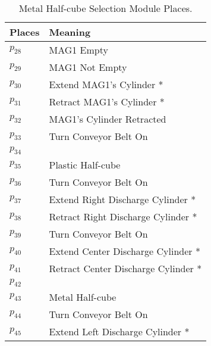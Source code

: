 \begin{table}[H]
\caption{Metal Half-cube Selection Module Places.}
\centering
\begin{tabular}{M{5cm}M{10cm}}
Places & Meaning\\
\hline
\hyperlink{partialNet:p281}{\hypertarget{partialTable:p28}{$p_{28}$}} & MAG1 Empty\\
\hyperlink{partialNet:p291}{\hypertarget{partialTable:p29}{$p_{29}$}} & MAG1 Not Empty\\
\hyperlink{partialNet:p301}{\hypertarget{partialTable:p30}{$p_{30}$}} & Extend MAG1's Cylinder *\\
\hyperlink{partialNet:p311}{\hypertarget{partialTable:p31}{$p_{31}$}} & Retract MAG1's Cylinder *\\
\hyperlink{partialNet:p321}{\hypertarget{partialTable:p32}{$p_{32}$}} & MAG1's Cylinder Retracted\\
\hyperlink{partialNet:p331}{\hypertarget{partialTable:p33}{$p_{33}$}} & Turn Conveyor Belt On\\
\hyperlink{partialNet:p341}{\hypertarget{partialTable:p34}{$p_{34}$}} & \\
\hyperlink{partialNet:p351}{\hypertarget{partialTable:p35}{$p_{35}$}} & Plastic Half-cube\\
\hyperlink{partialNet:p361}{\hypertarget{partialTable:p36}{$p_{36}$}} & Turn Conveyor Belt On\\
\hyperlink{partialNet:p371}{\hypertarget{partialTable:p37}{$p_{37}$}} & Extend Right Discharge Cylinder *\\
\hyperlink{partialNet:p381}{\hypertarget{partialTable:p38}{$p_{38}$}} & Retract Right Discharge Cylinder *\\
\hyperlink{partialNet:p391}{\hypertarget{partialTable:p39}{$p_{39}$}} & Turn Conveyor Belt On\\
\hyperlink{partialNet:p401}{\hypertarget{partialTable:p40}{$p_{40}$}} & Extend Center Discharge Cylinder *\\
\hyperlink{partialNet:p411}{\hypertarget{partialTable:p41}{$p_{41}$}} & Retract Center Discharge Cylinder *\\
\hyperlink{partialNet:p421}{\hypertarget{partialTable:p42}{$p_{42}$}} & \\
\hyperlink{partialNet:p431}{\hypertarget{partialTable:p43}{$p_{43}$}} & Metal Half-cube\\
\hyperlink{partialNet:p441}{\hypertarget{partialTable:p44}{$p_{44}$}} & Turn Conveyor Belt On\\
\hyperlink{partialNet:p451}{\hypertarget{partialTable:p45}{$p_{45}$}} & Extend Left Discharge Cylinder *\\

\end{tabular}
\end{table}
